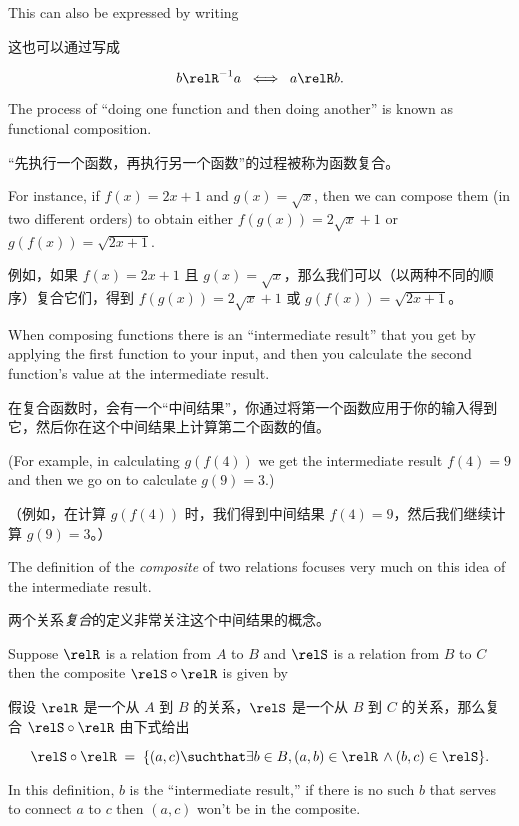 This can also be expressed by writing

这也可以通过写成

\[ b\relR^{-1}a \; \iff \; a\relR b.
\]

The process of ``doing one function and then doing another'' is known
as functional composition.

“先执行一个函数，再执行另一个函数”的过程被称为函数复合。

For instance,
if $f(x) = 2x+1$ and $g(x) = \sqrt{x}$, then we can compose them (in two
different orders) to obtain either $f(g(x)) = 2\sqrt{x}+1$ or 
$g(f(x)) = \sqrt{2x+1}$.

例如，如果 $f(x) = 2x+1$ 且 $g(x) = \sqrt{x}$，那么我们可以（以两种不同的顺序）复合它们，得到 $f(g(x)) = 2\sqrt{x}+1$ 或 $g(f(x)) = \sqrt{2x+1}$。

When composing functions there is an ``intermediate
result'' that you get by applying the first function to your input, and then
you calculate the second function's value at the intermediate result.

在复合函数时，会有一个“中间结果”，你通过将第一个函数应用于你的输入得到它，然后你在这个中间结果上计算第二个函数的值。

(For example, in calculating $g(f(4))$ we get the intermediate result
$f(4) = 9$ and then we go on to calculate $g(9) = 3$.)

（例如，在计算 $g(f(4))$ 时，我们得到中间结果 $f(4) = 9$，然后我们继续计算 $g(9) = 3$。）

The definition of the \emph{composite}
of two relations focuses very much on this idea
of the intermediate result.

两个关系\emph{复合}的定义非常关注这个中间结果的概念。

Suppose $\relR$ is a relation from
$A$ to $B$ and $\relS$ is a relation from $B$ to $C$ then the composite
$\relS \circ \relR$ is given by

假设 $\relR$ 是一个从 $A$ 到 $B$ 的关系，$\relS$ 是一个从 $B$ 到 $C$ 的关系，那么复合 $\relS \circ \relR$ 由下式给出

\[  \relS \circ \relR \;
= \; \{ (a,c) \suchthat \exists b \in B, (a,b) \in \relR \, \land (b,c) \in \relS \}.
\]

In this definition, $b$ is the ``intermediate result,'' if there is no such
$b$ that serves to connect $a$ to $c$ then $(a,c)$ won't be in the composite.

